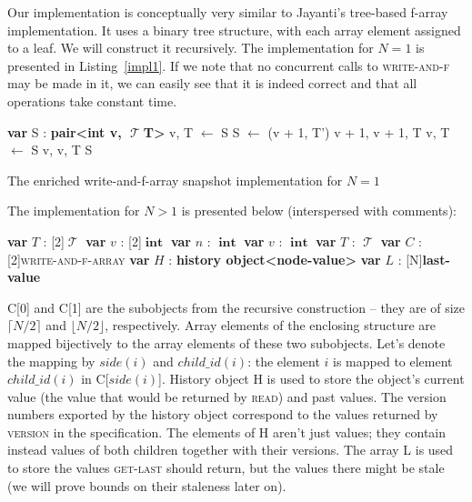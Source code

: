 \documentclass[a4paper,11pt]{article}
\def\T{\ensuremath{\operatorname{\mathcal{T}}}\text{ }}
\def\int{\ensuremath{\operatorname{\textbf{int}}}}
\newcommand{\fn}[1]{\textsc{#1}}
\newcommand{\var}[2]{\textbf{var }#1 : #2}
\newcommand{\arrayspec}[1]{\text{array}[#1]\text{ of }}
\begin{document}
Our implementation is conceptually very similar to Jayanti's tree-based f-array implementation. It uses a binary tree structure, with each array element assigned to a leaf.
We will construct it recursively. The implementation for $N = 1$ is presented in Listing~\ref{impl1}. If we note that no concurrent calls to \fn{write-and-f} may be made in it, we can easily
see that it is indeed correct and that all operations take constant time.

\begin{Listing}[!h]
\begin{algorithmic}[1]
	\State\var{S}{\textbf{pair<int v, \T T>}}
		\State v, T $\gets$ S
		\State S $\gets$ (v + 1, T')
		\State \Return v + 1, v + 1, T
	\EndFunction
		\State v, T $\gets$ S
		\State \Return v, v, T
	\EndFunction
		\State \Return S
	\EndFunction
\end{algorithmic}
\caption{The enriched write-and-f-array snapshot implementation for $N=1$}
\label{impl1}
\end{Listing}
\FloatBarrier

The implementation for $N > 1$ is presented below (interspersed with comments):
\begin{algorithmic}[1]
		\State \var{$T$}{\arrayspec{2}\T} 
		\State \var{$v$}{\arrayspec{2}\int} 
	\EndStruct
		\State \var{$n$}{\int}
		\State \var{$v$}{\int}
		\State \var{$T$}{\T}
	\EndStruct
	\State \var{$C$}{\arrayspec{2}\textsc{write-and-f-array}}  
	\State \var{$H$}{\textbf{history object<node-value>}} 
	\State \var{$L$}{\arrayspec{N}\textbf{last-value}} %
\end{algorithmic}

C[0] and C[1] are the subobjects from the recursive construction -- they are of size $\lceil{}N/2\rceil{}$ and $\lfloor{}N/2\rfloor{}$, respectively. Array elements of the enclosing
structure are mapped bijectively to the array elements of these two subobjects. Let's denote the mapping by $side(i)$ and $child\_id(i)$: the element $i$ is mapped to element $child\_id(i)$ in C[$side(i)$].
History object H is used to store the object's current value (the value that would be returned by \fn{read}) and past values. The version numbers exported by the history object correspond to the values returned by \fn{version}
in the specification. The elements of H aren't just values; they contain instead values of both children together with their versions.
The array L is used to store the values \fn{get-last} should return, but the values there might be stale (we will prove bounds on their staleness later on).
\end{document}
